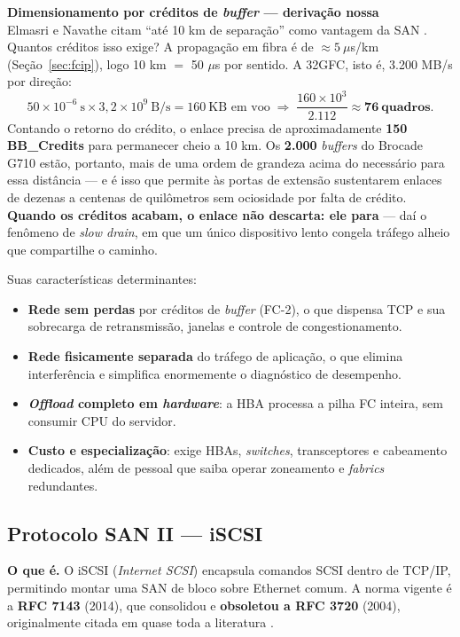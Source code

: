 \documentclass[11pt,a4paper]{article}
\newcommand{\destaque}[2]{%
  \begin{center}\begin{minipage}{0.96\textwidth}
  \colorbox{fundo}{\begin{minipage}{\dimexpr\linewidth-2\fboxsep}
  \vspace{2pt}\textbf{\color{azul}\small #1}\\[1pt]\footnotesize #2\vspace{3pt}
  \end{minipage}}\end{minipage}\end{center}}
\begin{document}
\destaque{Dimensionamento por créditos de \textit{buffer} --- derivação nossa}{%
Elmasri e Navathe citam ``até 10 km de separação'' como vantagem da SAN \cite{elmasri2018}. Quantos
créditos isso exige? A propagação em fibra é de $\approx 5\ \mu$s/km (Seção~\ref{sec:fcip}), logo
10 km $=$ 50 $\mu$s por sentido. A 32GFC, isto é, 3.200 MB/s por direção:
\[
50 \times 10^{-6}\ \text{s} \times 3{,}2 \times 10^{9}\ \text{B/s} = 160\ \text{KB em voo}
\;\Longrightarrow\;
\frac{160 \times 10^{3}}{2.112} \approx \mathbf{76\ \text{quadros}}.
\]
Contando o retorno do crédito, o enlace precisa de aproximadamente \textbf{150 BB\_Credits} para
permanecer cheio a 10 km. Os \textbf{2.000} \textit{buffers} do Brocade G710 \cite{brocadeg710}
estão, portanto, mais de uma ordem de grandeza acima do necessário para essa distância --- e é isso
que permite às portas de extensão sustentarem enlaces de dezenas a centenas de quilômetros sem
ociosidade por falta de crédito. \textbf{Quando os créditos acabam, o enlace não descarta: ele
para} --- daí o fenômeno de \textit{slow drain}, em que um único dispositivo lento congela tráfego
alheio que compartilhe o caminho.}

Suas características determinantes:

\begin{itemize}[leftmargin=0.7cm,itemsep=2pt]
\item \textbf{Rede sem perdas} por créditos de \textit{buffer} (FC-2), o que dispensa TCP e sua
      sobrecarga de retransmissão, janelas e controle de congestionamento.
\item \textbf{Rede fisicamente separada} do tráfego de aplicação, o que elimina interferência e
      simplifica enormemente o diagnóstico de desempenho.
\item \textbf{\textit{Offload} completo em \textit{hardware}}: a HBA processa a pilha FC inteira,
      sem consumir CPU do servidor.
\item \textbf{Custo e especialização}: exige HBAs, \textit{switches}, transceptores e cabeamento
      dedicados, além de pessoal que saiba operar zoneamento e \textit{fabrics} redundantes.
\end{itemize}

\subsection{Protocolo SAN II --- iSCSI}
\label{sec:iscsi}

\textbf{O que é.} O iSCSI (\textit{Internet SCSI}) encapsula comandos SCSI dentro de TCP/IP,
permitindo montar uma SAN de bloco sobre Ethernet comum. A norma vigente é a \textbf{RFC 7143}
(2014), que consolidou e \textbf{obsoletou a RFC 3720} (2004), originalmente citada em quase toda a
literatura \cite{rfc7143}.
\end{document}
